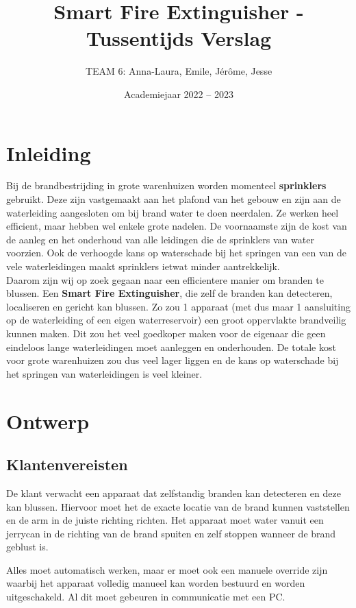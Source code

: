 \documentclass[kulak]{kulakarticle} %
\title{Smart Fire Extinguisher - Tussentijds Verslag}
\author{TEAM 6: Anna-Laura, Emile, Jérôme, Jesse}
\date{Academiejaar 2022 -- 2023}
\begin{document}
\maketitle



\section*{Inleiding}
                                          
Bij de brandbestrijding in grote warenhuizen worden momenteel \textbf{sprinklers} gebruikt. Deze zijn vastgemaakt aan het plafond van het gebouw en zijn aan de waterleiding aangesloten om bij brand water te doen neerdalen. Ze werken heel efficient, maar hebben wel enkele grote nadelen. De voornaamste zijn de kost van de aanleg en het onderhoud van alle leidingen die de sprinklers van water voorzien. Ook de verhoogde kans op waterschade bij het springen van een van de vele waterleidingen maakt sprinklers ietwat minder aantrekkelijk. \\

Daarom zijn wij op zoek gegaan naar een efficientere manier om branden te blussen. Een \textbf{Smart Fire Extinguisher}, die zelf de branden kan detecteren, localiseren en gericht kan blussen. Zo zou 1 apparaat (met dus maar 1 aansluiting op de waterleiding of een eigen waterreservoir) een groot oppervlakte brandveilig kunnen maken. Dit zou het veel goedkoper maken voor de eigenaar die geen eindeloos lange waterleidingen moet aanleggen en onderhouden. De totale kost voor grote warenhuizen zou dus veel lager liggen en de kans op waterschade bij het springen van waterleidingen is veel kleiner.



\section{Ontwerp}
\subsection{Klantenvereisten}

De klant verwacht een apparaat dat zelfstandig branden kan detecteren en deze kan blussen. Hiervoor moet het de exacte locatie van de brand kunnen vaststellen en de arm in de juiste richting richten. Het apparaat moet water vanuit een jerrycan in de richting van de brand spuiten en zelf stoppen wanneer de brand geblust is. 

Alles moet automatisch werken, maar er moet ook een manuele override zijn waarbij het apparaat volledig manueel kan worden bestuurd en worden uitgeschakeld. Al dit moet gebeuren in communicatie met een PC. 
\end{document}
